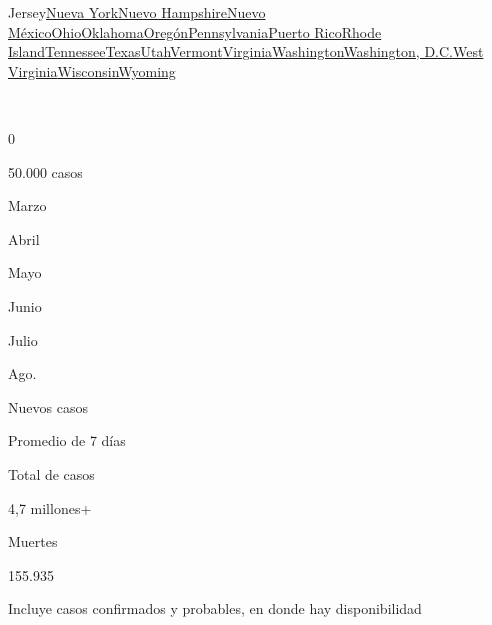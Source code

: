 {Jersey}\href{https://www.nytimes.com/interactive/2020/us/new-york-coronavirus-cases.html}{Nueva
York}\href{https://www.nytimes.com/interactive/2020/us/new-hampshire-coronavirus-cases.html}{Nuevo
Hampshire}\href{https://www.nytimes.com/interactive/2020/us/new-mexico-coronavirus-cases.html}{Nuevo
México}\href{https://www.nytimes.com/interactive/2020/us/ohio-coronavirus-cases.html}{Ohio}\href{https://www.nytimes.com/interactive/2020/us/oklahoma-coronavirus-cases.html}{Oklahoma}\href{https://www.nytimes.com/interactive/2020/us/oregon-coronavirus-cases.html}{Oregón}\href{https://www.nytimes.com/interactive/2020/us/pennsylvania-coronavirus-cases.html}{Pennsylvania}\href{https://www.nytimes.com/interactive/2020/us/puerto-rico-coronavirus-cases.html}{Puerto
Rico}\href{https://www.nytimes.com/interactive/2020/us/rhode-island-coronavirus-cases.html}{Rhode
Island}\href{https://www.nytimes.com/interactive/2020/us/tennessee-coronavirus-cases.html}{Tennessee}\href{https://www.nytimes.com/interactive/2020/us/texas-coronavirus-cases.html}{Texas}\href{https://www.nytimes.com/interactive/2020/us/utah-coronavirus-cases.html}{Utah}\href{https://www.nytimes.com/interactive/2020/us/vermont-coronavirus-cases.html}{Vermont}\href{https://www.nytimes.com/interactive/2020/us/virginia-coronavirus-cases.html}{Virginia}\href{https://www.nytimes.com/interactive/2020/us/washington-coronavirus-cases.html}{Washington}\href{https://www.nytimes.com/interactive/2020/us/washington-dc-coronavirus-cases.html}{Washington,
D.C.}\href{https://www.nytimes.com/interactive/2020/us/west-virginia-coronavirus-cases.html}{West
Virginia}\href{https://www.nytimes.com/interactive/2020/us/wisconsin-coronavirus-cases.html}{Wisconsin}\href{https://www.nytimes.com/interactive/2020/us/wyoming-coronavirus-cases.html}{Wyoming}

~

0

50.000 casos

Marzo

Abril

Mayo

Junio

Julio

Ago.

Nuevos casos

Promedio de 7 días

Total de casos

4,7 millones+

Muertes

155.935

Incluye casos confirmados y probables, en donde hay disponibilidad

